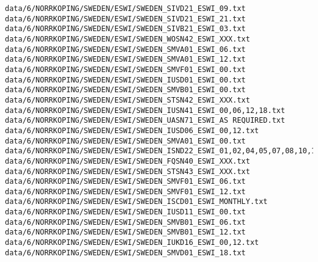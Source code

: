 \documentclass[12pt,a4paper]{article}
\begin{document}
\begin{lstlisting}[breaklines]
data/6/NORRKOPING/SWEDEN/ESWI/SWEDEN_SIVD21_ESWI_09.txt
data/6/NORRKOPING/SWEDEN/ESWI/SWEDEN_SIVD21_ESWI_21.txt
data/6/NORRKOPING/SWEDEN/ESWI/SWEDEN_SIVB21_ESWI_03.txt
data/6/NORRKOPING/SWEDEN/ESWI/SWEDEN_WOSN42_ESWI_XXX.txt
data/6/NORRKOPING/SWEDEN/ESWI/SWEDEN_SMVA01_ESWI_06.txt
data/6/NORRKOPING/SWEDEN/ESWI/SWEDEN_SMVA01_ESWI_12.txt
data/6/NORRKOPING/SWEDEN/ESWI/SWEDEN_SMVF01_ESWI_00.txt
data/6/NORRKOPING/SWEDEN/ESWI/SWEDEN_IUSD01_ESWI_00.txt
data/6/NORRKOPING/SWEDEN/ESWI/SWEDEN_SMVB01_ESWI_00.txt
data/6/NORRKOPING/SWEDEN/ESWI/SWEDEN_STSN42_ESWI_XXX.txt
data/6/NORRKOPING/SWEDEN/ESWI/SWEDEN_IUSN41_ESWI_00,06,12,18.txt
data/6/NORRKOPING/SWEDEN/ESWI/SWEDEN_UASN71_ESWI_AS REQUIRED.txt
data/6/NORRKOPING/SWEDEN/ESWI/SWEDEN_IUSD06_ESWI_00,12.txt
data/6/NORRKOPING/SWEDEN/ESWI/SWEDEN_SMVA01_ESWI_00.txt
data/6/NORRKOPING/SWEDEN/ESWI/SWEDEN_ISND22_ESWI_01,02,04,05,07,08,10,11,13,14,16,17,19,20,22,23.txt
data/6/NORRKOPING/SWEDEN/ESWI/SWEDEN_FQSN40_ESWI_XXX.txt
data/6/NORRKOPING/SWEDEN/ESWI/SWEDEN_STSN43_ESWI_XXX.txt
data/6/NORRKOPING/SWEDEN/ESWI/SWEDEN_SMVF01_ESWI_06.txt
data/6/NORRKOPING/SWEDEN/ESWI/SWEDEN_SMVF01_ESWI_12.txt
data/6/NORRKOPING/SWEDEN/ESWI/SWEDEN_ISCD01_ESWI_MONTHLY.txt
data/6/NORRKOPING/SWEDEN/ESWI/SWEDEN_IUSD11_ESWI_00.txt
data/6/NORRKOPING/SWEDEN/ESWI/SWEDEN_SMVB01_ESWI_06.txt
data/6/NORRKOPING/SWEDEN/ESWI/SWEDEN_SMVB01_ESWI_12.txt
data/6/NORRKOPING/SWEDEN/ESWI/SWEDEN_IUKD16_ESWI_00,12.txt
data/6/NORRKOPING/SWEDEN/ESWI/SWEDEN_SMVD01_ESWI_18.txt
\end{lstlisting}
\end{document}
